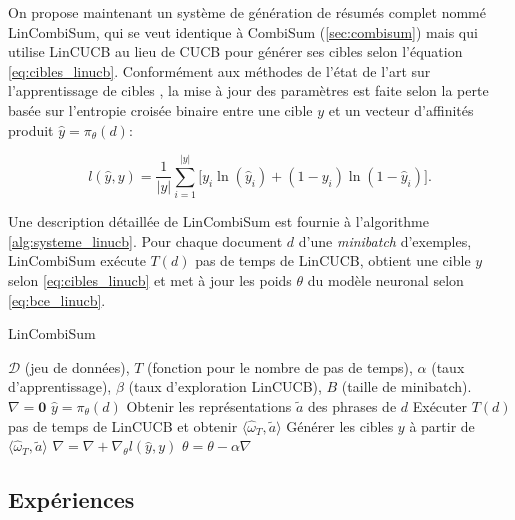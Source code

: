 On propose maintenant un système de génération de résumés complet nommé LinCombiSum,
qui se veut identique à CombiSum (\ref{sec:combisum}) mais qui utilise LinCUCB
au lieu de CUCB pour générer ses cibles selon l'équation \ref{eq:cibles_linucb}.
Conformément aux méthodes de l'état de l'art sur l'apprentissage 
de cibles \citep{liu2019text}, la mise à jour des paramètres est faite selon la 
perte basée sur l'entropie croisée binaire entre une cible $y$
et un vecteur d'affinités produit $\hat{y} = \pi_\theta(d)$:

\begin{equation}
    l(\hat{y}, y) = \frac{1}{|y|} \sum_{i=1}^{|y|}\big[y_i \ln(\hat{y}_i) + (1 - y_i) \ln(1 - \hat{y}_i) \big].
    \label{eq:bce_linucb}
\end{equation}

Une description détaillée de LinCombiSum est fournie à l'algorithme \ref{alg:systeme_linucb}.
Pour chaque document $d$ d'une \textit{minibatch} d'exemples, LinCombiSum exécute 
$T(d)$ pas de temps de LinCUCB, obtient une cible $y$ selon \eqref{eq:cibles_linucb}
et met à jour les poids $\theta$ du modèle neuronal selon \eqref{eq:bce_linucb}.

\begin{algorithm}
    \caption{LinCombiSum}
    \begin{algorithmic}[1]
        \Require  $\mathcal{D}$ (jeu de données), $T$ (fonction pour le nombre de pas de temps), $\alpha$ (taux d'apprentissage), $\beta$ (taux d'exploration LinCUCB), $B$ (taille de minibatch).
         
        \State $\nabla = \mathbf{0}$
        \State $\hat{y} = \pi_\theta(d)$
        \State Obtenir les représentations $\tilde{a}$ des phrases de $d$ 
        \State Exécuter $T(d)$ pas de temps de LinCUCB et obtenir $\langle \hat{\omega}_T, \tilde{a} \rangle$
        \State Générer les cibles $y$ à partir de $\langle \hat{\omega}_T, \tilde{a} \rangle$ 
        \State $\nabla = \nabla + \nabla_\theta l(\hat{y}, y)$
        \EndFor
        \State $\theta = \theta - \alpha \nabla$
        \EndWhile
    \end{algorithmic}
    \label{alg:systeme_linucb}
\end{algorithm}

\subsection{Expériences}

